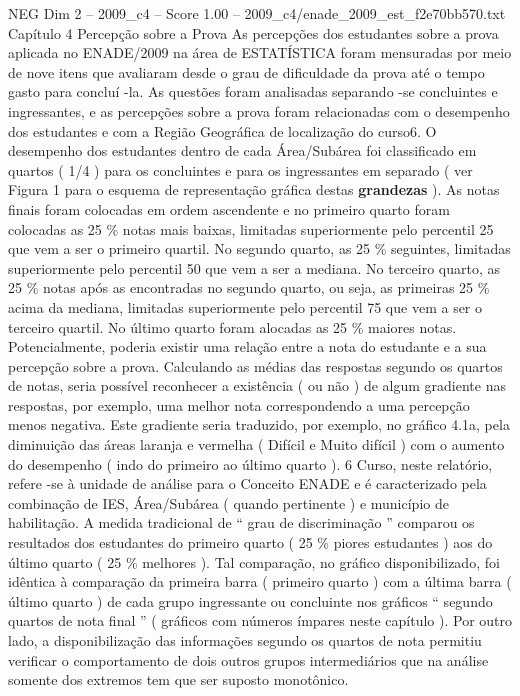 \begin{textsample}{NEG Dim 2 – 2009\_c4 – Score 1.00 – 2009\_c4/enade\_2009\_est\_f2e70bb570.txt}  \label{ex:f2_neg_231}
Capítulo 4 Percepção sobre a Prova As percepções dos estudantes sobre a prova aplicada no ENADE/2009 na área de ESTATÍSTICA foram mensuradas por meio de nove itens que avaliaram desde o grau de dificuldade da prova até o tempo gasto para concluí -la.
As questões foram analisadas separando -se concluintes e ingressantes, e as percepções sobre a prova foram relacionadas com o desempenho dos estudantes e com a Região Geográfica de localização do curso6.
O desempenho dos estudantes dentro de cada Área/Subárea foi classificado em quartos ( 1/4 ) para os concluintes e para os ingressantes em separado ( ver Figura 1 para o esquema de representação gráfica destas \textbf{grandezas} ).
As notas finais foram colocadas em ordem ascendente e no primeiro quarto foram colocadas as 25 \% notas mais baixas, limitadas superiormente pelo percentil 25 que vem a ser o primeiro quartil.
No segundo quarto, as 25 \% seguintes, limitadas superiormente pelo percentil 50 que vem a ser a mediana.
No terceiro quarto, as 25 \% notas após as encontradas no segundo quarto, ou seja, as primeiras 25 \% acima da mediana, limitadas superiormente pelo percentil 75 que vem a ser o terceiro quartil.
No último quarto foram alocadas as 25 \% maiores notas.
Potencialmente, poderia existir uma relação entre a nota do estudante e a sua percepção sobre a prova.
Calculando as médias das respostas segundo os quartos de notas, seria possível reconhecer a existência ( ou não ) de algum gradiente nas respostas, por exemplo, uma melhor nota correspondendo a uma percepção menos negativa.
Este gradiente seria traduzido, por exemplo, no gráfico 4.1a, pela diminuição das áreas laranja e vermelha ( Difícil e Muito difícil ) com o aumento do desempenho ( indo do primeiro ao último quarto ). 6 Curso, neste relatório, refere -se à unidade de análise para o Conceito ENADE e é caracterizado pela combinação de IES, Área/Subárea ( quando pertinente ) e município de habilitação.
A medida tradicional de “ grau de discriminação ” comparou os resultados dos estudantes do primeiro quarto ( 25 \% piores estudantes ) aos do último quarto ( 25 \% melhores ).
Tal comparação, no gráfico disponibilizado, foi idêntica à comparação da primeira barra ( primeiro quarto ) com a última barra ( último quarto ) de cada grupo ingressante ou concluinte nos gráficos “ segundo quartos de nota final ” ( gráficos com números ímpares neste capítulo ).
Por outro lado, a disponibilização das informações segundo os quartos de nota permitiu verificar o comportamento de dois outros grupos intermediários que na análise somente dos extremos tem que ser suposto monotônico.

\end{textsample}
